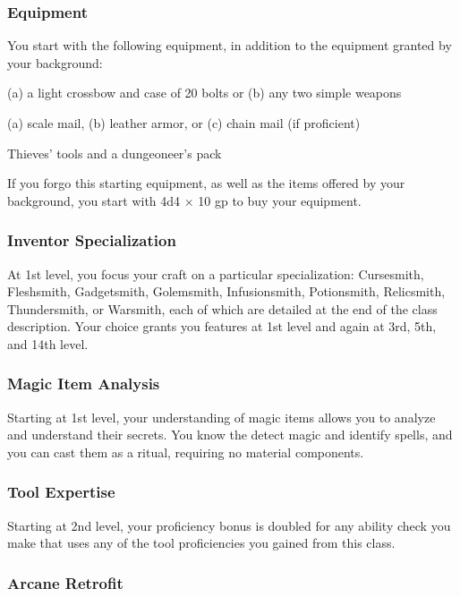 \documentclass[11pt,twoside,openany]{book}  %
\begin{document}
\subsubsection{Equipment}

You start with the following equipment, in addition to the equipment granted by your background:

\begin{fiveitemize}
  \item (a) a light crossbow and case of 20 bolts or (b) any two simple weapons
  \item (a) scale mail, (b) leather armor, or (c) chain mail (if proficient)
  \item Thieves’ tools and a dungeoneer’s pack
\end{fiveitemize}

If you forgo this starting equipment, as well as the items offered by your background, you start with 4d4 × 10 gp to buy your equipment.

\subsubsection{Inventor Specialization}

At 1st level, you focus your craft on a particular specialization: Cursesmith, Fleshsmith, Gadgetsmith, Golemsmith, Infusionsmith, Potionsmith, Relicsmith, Thundersmith, or Warsmith, each of which are detailed at the end of the class description. Your choice grants you features at 1st level and again at 3rd, 5th, and 14th level.

\subsubsection{Magic Item Analysis}

Starting at 1st level, your understanding of magic items allows you to analyze and understand their secrets. You know the detect magic and identify spells, and you can cast them as a ritual, requiring no material components.

\subsubsection{Tool Expertise}

Starting at 2nd level, your proficiency bonus is doubled for any ability check you make that uses any of the tool proficiencies you gained from this class.

\subsubsection{Arcane Retrofit}
\end{document}
